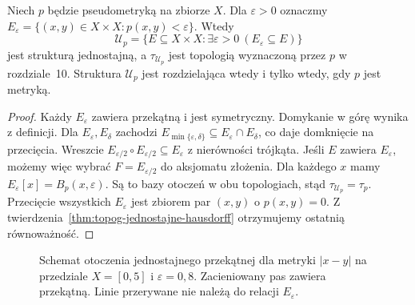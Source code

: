 \begin{twierdzenie}
\label{thm:topog-jednostajne-pseudometryka}
Niech $p$ będzie pseudometryką na zbiorze $X$.
Dla $\varepsilon>0$ oznaczmy
$E_\varepsilon=\{(x,y)\in X\times X:p(x,y)<\varepsilon\}$.
Wtedy
\[
 \mathcal U_p=\{E\subseteq X\times X:
      \exists\varepsilon>0\ (E_\varepsilon\subseteq E)\}
\]
jest strukturą jednostajną, a $\tau_{\mathcal U_p}$
jest topologią wyznaczoną przez $p$
w rozdziale~10. Struktura $\mathcal U_p$
jest rozdzielająca wtedy i tylko wtedy, gdy
$p$ jest metryką.
\end{twierdzenie}
\begin{proof}
Każdy $E_\varepsilon$ zawiera przekątną
i jest symetryczny. Domykanie w górę wynika
z definicji. Dla $E_\varepsilon,E_\delta$
zachodzi $E_{\min\{\varepsilon,\delta\}}
\subseteq E_\varepsilon\cap E_\delta$,
co daje domknięcie na przecięcia. Wreszcie
$E_{\varepsilon/2}\circ E_{\varepsilon/2}
\subseteq E_\varepsilon$ z nierówności trójkąta.
Jeśli $E$ zawiera $E_\varepsilon$,
możemy więc wybrać $F=E_{\varepsilon/2}$
do aksjomatu złożenia.
Dla każdego $x$ mamy
$E_\varepsilon[x]=B_p(x,\varepsilon)$.
Są to bazy otoczeń w obu topologiach,
stąd $\tau_{\mathcal U_p}=\tau_p$.
Przecięcie wszystkich $E_\varepsilon$
jest zbiorem par $(x,y)$ o $p(x,y)=0$.
Z twierdzenia~\ref{thm:topog-jednostajne-hausdorff}
otrzymujemy ostatnią równoważność.
\end{proof}

\begin{figure}[htbp]
\centering
{}
\caption{Schemat otoczenia jednostajnego przekątnej dla metryki
$|x-y|$ na przedziale $X=[0,5]$ i $\varepsilon=0{,}8$.
Zacieniowany pas zawiera przekątną. Linie przerywane
nie należą do relacji $E_\varepsilon$.}
\label{fig:topog-jednostajne-metryczny-pas}
\end{figure}


